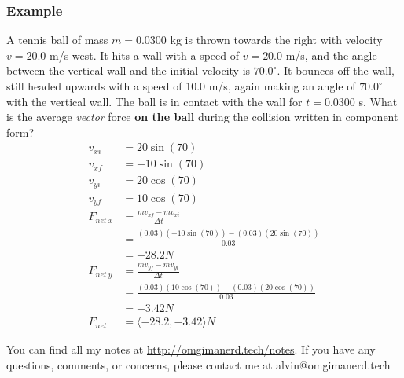 \documentclass[letterpaper, 12pt]{math}
\begin{document}
\subsubsection*{Example}
A tennis ball of mass \( m = 0.0300 \) kg is thrown towards the right with
velocity \( v = 20.0 \) m/s west. It hits a wall with a speed of \( v = 20.0 \)
m/s, and the angle between the vertical wall and the initial velocity is
\( 70.0^{\circ} \). It bounces off the wall, still headed upwards with a speed
of 10.0 m/s, again making an angle of \( 70.0^{\circ} \) with the vertical wall.
The ball is in contact with the wall for \( t = 0.0300 \) s. What is the average
\textit{vector} force \textbf{on the ball} during the collision written in
component form?
\begin{align*}
  v_{xi} &= 20\sin(70) \\
  v_{xf} &= -10\sin(70) \\
  v_{yi} &= 20\cos(70) \\
  v_{yf} &= 10\cos(70) \\
  F_{net~x} &= \frac{mv_{xf}-mv_{xi}}{\Delta{t}} \\
  &= \frac{(0.03)(-10\sin(70))-(0.03)(20\sin(70))}{0.03} \\
  &= -28.2N \\
  F_{net~y} &= \frac{mv_{yf}-mv_{yi}}{\Delta{t}} \\
  &= \frac{(0.03)(10\cos(70))-(0.03)(20\cos(70))}{0.03} \\
  &= -3.42N \\
  F_{net} &= \langle-28.2,-3.42\rangle N
\end{align*}

\begin{center}
  You can find all my notes at \url{http://omgimanerd.tech/notes}. If you have
  any questions, comments, or concerns, please contact me at
  alvin@omgimanerd.tech
\end{center}
\end{document}
